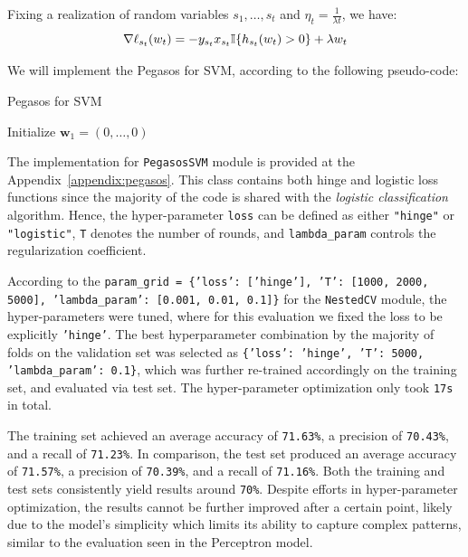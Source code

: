 Fixing a realization of random variables $s_1,\dots,s_t$ and $\eta_t = \frac{1}{\lambda t}$, we have:
\begin{equation}
    \nabla \ell_{s_t} (w_t) = -y_{s_t} x_{s_t} \mathbb{I} \{ h_{s_t}(w_t) > 0 \} + \lambda w_t \\
\end{equation}

We will implement the Pegasos for SVM, according to the following pseudo-code:

\begin{algorithm}[H]
    \SetAlgoLined
    \DontPrintSemicolon
    \caption{Pegasos for SVM} \vspace{4pt}
    Initialize $\boldsymbol{w}_1 = (0, \dots, 0)$\\
\end{algorithm}

The implementation for \texttt{PegasosSVM} module is provided at the Appendix~\ref{appendix:pegasos}. This class contains both hinge and logistic loss functions since the majority of the code is shared with the \textit{logistic classification} algorithm. Hence, the hyper-parameter \texttt{loss} can be defined as either \texttt{"hinge"} or \texttt{"logistic"}, \texttt{T} denotes the number of rounds, and \texttt{lambda\_param} controls the regularization coefficient.

According to the \texttt{param\_grid = \{'loss': ['hinge'], 'T': [1000, 2000, 5000], 'lambda\_param': [0.001, 0.01, 0.1]\}} for the \texttt{NestedCV} module, the hyper-parameters were tuned, where for this evaluation we fixed the loss to be explicitly \texttt{'hinge'}. The best hyperparameter combination by the majority of folds on the validation set was selected as \texttt{\{'loss': 'hinge', 'T': 5000, 'lambda\_param': 0.1\}}, which was further re-trained accordingly on the training set, and evaluated via test set. The hyper-parameter optimization only took \texttt{17s} in total.

The training set achieved an average accuracy of \texttt{71.63\%}, a precision of \texttt{70.43\%}, and a recall of \texttt{71.23\%}. In comparison, the test set produced an average accuracy of \texttt{71.57\%}, a precision of \texttt{70.39\%}, and a recall of \texttt{71.16\%}. Both the training and test sets consistently yield results around \texttt{70\%}. Despite efforts in hyper-parameter optimization, the results cannot be further improved after a certain point, likely due to the model's simplicity which limits its ability to capture complex patterns, similar to the evaluation seen in the Perceptron model.

